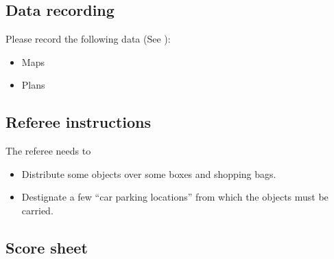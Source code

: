 \subsection{Data recording}
  Please record the following data (See ):
  \begin{itemize}
   \item Maps
   \item Plans
  \end{itemize}

\subsection{Referee instructions}

The referee needs to
\begin{itemize}
\item Distribute some objects over some boxes and shopping bags.
\item Destignate a few ``car parking locations'' from which the objects must be carried.
\end{itemize}

\subsection{Score sheet}
